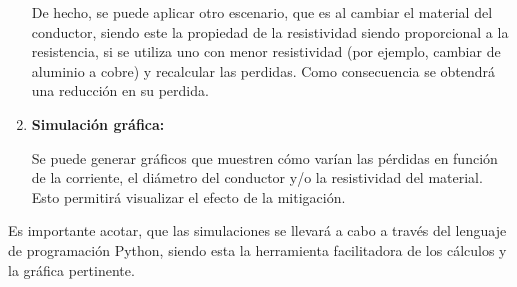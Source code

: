 \begin{enumerate}
                De hecho, se puede aplicar otro escenario, que es al cambiar el material del conductor, siendo este la propiedad de la resistividad siendo proporcional a la resistencia, si se utiliza uno con menor resistividad (por ejemplo, cambiar de aluminio a cobre) y recalcular las perdidas. Como consecuencia se obtendrá una reducción en su perdida.

            \item \textbf{Simulación gráfica:}

                Se puede generar gráficos que muestren cómo varían las pérdidas en función de la corriente, el diámetro del conductor y/o la resistividad del material. Esto permitirá visualizar el efecto de la mitigación.
        \end{enumerate}

        Es importante acotar, que las simulaciones se llevará a cabo a través del lenguaje de programación Python, siendo esta la herramienta facilitadora de los cálculos y la gráfica pertinente.
    





\newpage
